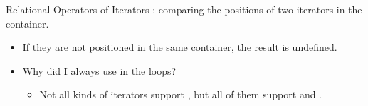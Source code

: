 \begin{frame}[fragile]{Relational Operators of Iterators}
    \ttt{<, <=, >, >=}: comparing the positions of two iterators in the container.
    \begin{itemize}
        \item If they are not positioned in the same container, the result is undefined.
        \item Why did I always use \ttt{!=} in the  loops?
        \pause
        \begin{itemize}
            \item Not all kinds of iterators support \ttt{<, <=, >, >=}, but all of them support \ttt{==} and \ttt{!=}.
        \end{itemize}
    \end{itemize}
\end{frame}